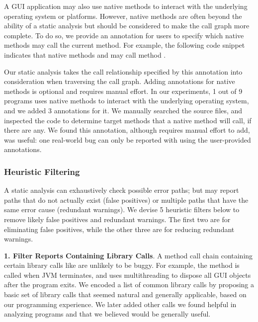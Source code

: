 A GUI application may also use native methods to interact with the underlying
operating system or platforms. However, native methods are often
beyond the ability of a static analysis but should be considered to make
the call graph more complete. To do so, we provide an annotation 
for users to specify which native methods may call the current method. For example,
the following code snippet indicates that native methods  and 
may call method .

{}

{}


Our static analysis takes the call relationship specified by this
annotation into consideration when traversing the call graph. 
Adding annotations for native methods is optional and requires manual effort.
In our experiments, 1 out of 9 programs uses native methods to interact with
the underlying operating system, and we added 3 annotations for it. We manually
searched the source files, and inspected the code to determine target methods
that a native method will call, if there are any. We found this annotation,
although requires manual effort to add, was useful: one real-world bug
can only be reported with using the user-provided annotations.

\subsubsection{Heuristic Filtering}
\label{sec:heuristic}

A static analysis can exhaustively check possible error paths; but may report
paths that do not actually exist (false positives) or multiple paths
 that have the same error cause (redundant warnings). We devise
5 heuristic filters below to remove likely false positives and redundant warnings.
The first two are for eliminating false positives, while the
other three are for reducing redundant warnings.




\textbf{1. Filter Reports Containing Library Calls}. A
method call chain containing certain library calls
like  are unlikely to
be buggy. For example, the 
method is called when JVM terminates, and uses multithreading
to dispose all GUI objects after the program exits.
We encoded a list of common library calls by proposing
a basic set of library calls that seemed natural and
generally applicable, based on our programming experience.
We later added other calls we found helpful in analyzing
programs and that we believed would be generally useful.

